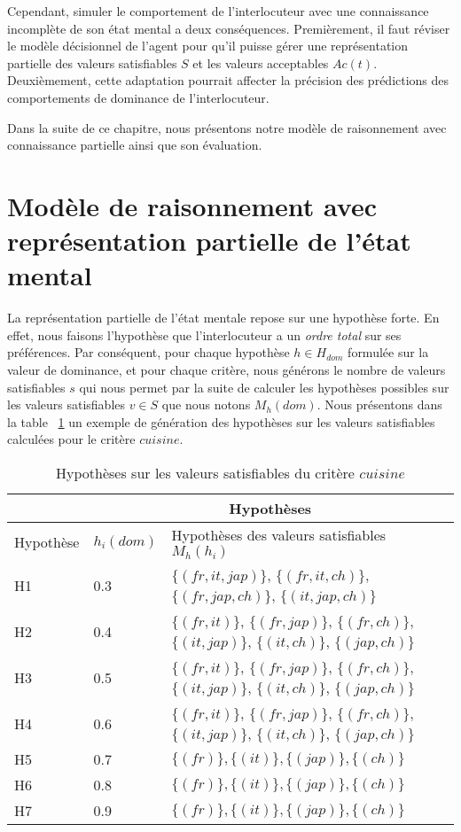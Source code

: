		Cependant, simuler le comportement de l'interlocuteur avec une connaissance incomplète de son état mental a deux conséquences.
		Premièrement, il faut réviser  le modèle décisionnel de l'agent pour qu'il puisse gérer une représentation partielle des valeurs satisfiables $S$ et les valeurs acceptables $Ac(t)$. Deuxièmement, cette adaptation pourrait affecter la précision des prédictions des comportements de dominance de l'interlocuteur.
		
		Dans la suite de ce chapitre, nous présentons notre modèle de raisonnement avec connaissance partielle ainsi que son évaluation. 
		
			

\section{Modèle de raisonnement avec représentation partielle de l'état mental}
	La représentation partielle de l'état mentale repose sur une hypothèse forte. En effet, nous faisons l'hypothèse que l'interlocuteur a un \textit{ordre total} sur ses préférences. Par conséquent, pour chaque hypothèse $h\in H_{dom} $ formulée sur la valeur de dominance, et pour chaque critère, nous générons le nombre de valeurs satisfiables $s$ qui nous permet par la suite de calculer les hypothèses possibles sur les valeurs satisfiables $v\in S$ que nous notons $M_h(dom)$. Nous présentons dans la table ~\ref{tab:hypo} un exemple de génération des hypothèses sur les valeurs satisfiables calculées pour le critère $cuisine$. 


		\begin{table}[!tb]
			\centering
			\caption{Hypothèses sur les valeurs satisfiables du critère $cuisine$}
			\begin{tabular}{ |p{2cm}|p{1.5cm}|p{8cm}| }
				\hline
				& \multicolumn{2}{c|}{Hypothèses}  \\
				\hline
				Hypothèse & $h_i(dom)$ & Hypothèses des valeurs satisfiables $ M_h(h_i)$\\
				\hline
				H1&0.3&$\{(fr,it,jap)\}$, $\{(fr,it,ch)\}$, $\{(fr,jap,ch)\}$, $\{(it,jap,ch)\}$ \\
				\hline
				H2&0.4&$\{(fr,it)\}$, $\{(fr,jap)\}$, $\{(fr,ch)\}$, $\{(it,jap)\}$, $\{(it,ch)\}$, $\{(jap,ch)\}$ \\
				\hline
				H3&0.5&$\{(fr,it)\}$, $\{(fr,jap)\}$, $\{(fr,ch)\}$, $\{(it,jap)\}$, $\{(it,ch)\}$, $\{(jap,ch)\}$\\
				\hline
				H4&0.6&$\{(fr,it)\}$, $\{(fr,jap)\}$, $\{(fr,ch)\}$, $\{(it,jap)\}$, $\{(it,ch)\}$, $\{(jap,ch)\}$ \\
				\hline
				H5&0.7&$\{(fr)\}, \{(it)\}, \{(jap)\}, \{(ch)\}$\\
				\hline
				H6&0.8&$\{(fr)\}, \{(it)\}, \{(jap)\}, \{(ch)\}$ \\
				\hline
				
				H7&0.9&$\{(fr)\}, \{(it)\}, \{(jap)\}, \{(ch)\}$ \\
				\hline
			\end{tabular}		
			\label{tab:hypo}
		\end{table}
		
